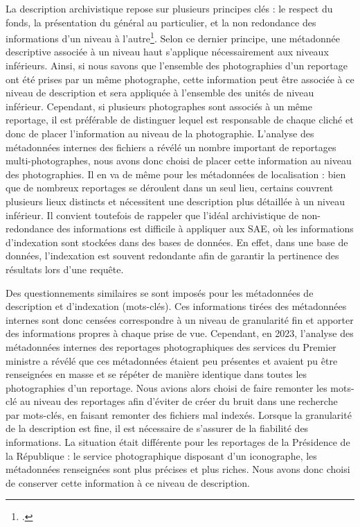 La description archivistique repose sur plusieurs principes clés : le respect du fonds, la présentation du général au particulier, et la non redondance des informations d'un niveau à l'autre\footcite{isad2000}. Selon ce dernier principe, une métadonnée descriptive associée à un niveau haut s'applique nécessairement aux niveaux inférieurs. Ainsi, si nous savons que l'ensemble des photographies d'un reportage ont été prises par un même photographe, cette information peut être associée à ce niveau de description et sera appliquée à l'ensemble des unités de niveau inférieur. Cependant, si plusieurs photographes sont associés à un même reportage, il est préférable de distinguer lequel est responsable de chaque cliché et donc de placer l'information au niveau de la photographie. L'analyse des métadonnées internes des fichiers a révélé un nombre important de reportages multi-photographes, nous avons donc choisi de placer cette information au niveau des photographies. Il en va de même pour les métadonnées de localisation : bien que de nombreux reportages se déroulent dans un seul lieu, certains couvrent plusieurs lieux distincts et nécessitent une description plus détaillée à un niveau inférieur. Il convient toutefois de rappeler que l'idéal archivistique de non-redondance des informations est difficile à appliquer aux SAE, où les informations d'indexation sont stockées dans des bases de données. En effet, dans une base de données, l'indexation est souvent redondante afin de garantir la pertinence des résultats lors d'une requête.

Des questionnements similaires se sont imposés pour les métadonnées de description et d'indexation (mots-clés). Ces informations tirées des métadonnées internes sont donc censées correspondre à un niveau de granularité fin et apporter des informations propres à chaque prise de vue. Cependant, en 2023, l'analyse des métadonnées internes des reportages photographiques des services du Premier ministre a révélé que ces métadonnées étaient peu présentes et avaient pu être renseignées en masse et se répéter de manière identique dans toutes les photographies d'un reportage. Nous avions alors choisi de faire remonter les mots-clé au niveau des reportages afin d'éviter de créer du bruit dans une recherche par mots-clés, en faisant remonter des fichiers mal indexés. Lorsque la granularité de la description est fine, il est nécessaire de s'assurer de la fiabilité des informations. La situation était différente pour les reportages de la Présidence de la République : le service photographique disposant d'un iconographe, les métadonnées renseignées sont plus précises et plus riches. Nous avons donc choisi de conserver cette information à ce niveau de description.

